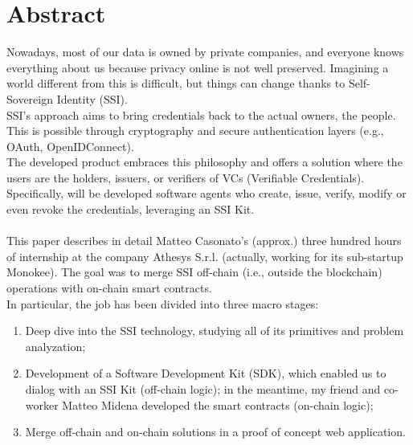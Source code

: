 
\cleardoublepage
{}
{}
\begingroup
\let\clearpage\relax
\let\cleardoublepage\relax
\let\cleardoublepage\relax

\chapter*{Abstract}

Nowadays, most of our data is owned by private companies, and everyone knows 
everything about us because privacy online is not well preserved. Imagining a 
world different from this is difficult, but things can change thanks to 
Self-Sovereign Identity (SSI).\\
SSI's approach aims to bring credentials back to the actual owners, the people.
This is possible through cryptography and secure authentication layers 
(e.g., OAuth, OpenIDConnect).\\
The developed product embraces this philosophy and offers a solution where the 
users are the holders, issuers, or verifiers of VCs (Verifiable Credentials). 
Specifically, will be developed software agents who create, issue, verify, 
modify or even revoke the credentials, leveraging an SSI Kit.\\\\
This paper describes in detail Matteo Casonato's (approx.) three hundred hours 
of internship at the company Athesys S.r.l. (actually, working for its 
sub-startup Monokee). The goal was to merge SSI off-chain (i.e., outside the 
blockchain) operations with on-chain smart contracts.\\
In particular, the job has been divided into three macro stages:
\begin{enumerate}
    \item Deep dive into the SSI technology, studying all of its primitives 
    and problem analyzation;
    \item Development of a Software Development Kit (SDK), which enabled us 
    to dialog with an SSI Kit (off-chain logic); in the meantime, my friend 
    and co-worker Matteo Midena developed the smart contracts (on-chain logic);
    \item Merge off-chain and on-chain solutions in a proof of concept web 
    application.
\end{enumerate}

%
%

\endgroup			

\vfill

